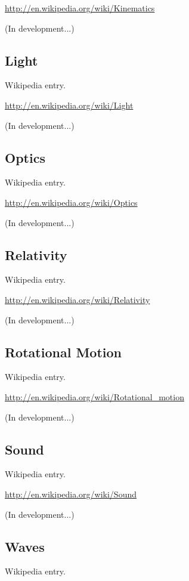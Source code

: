 \documentclass[12pt,twoside]{book}
\begin{document}
\href{http://en.wikipedia.org/wiki/Kinematics}{http://en.wikipedia.org/wiki/Kinematics}

(In development...)

\subsection[Light]{Light}
Wikipedia entry.

\href{http://en.wikipedia.org/wiki/Light}{http://en.wikipedia.org/wiki/Light}

(In development...)

\subsection[Optics]{Optics}
Wikipedia entry.

\href{http://en.wikipedia.org/wiki/Optics}{http://en.wikipedia.org/wiki/Optics}

(In development...)

\subsection[Relativity]{Relativity}
Wikipedia entry.

\href{http://en.wikipedia.org/wiki/Relativity}{http://en.wikipedia.org/wiki/Relativity}

(In development...)

\subsection[Rotational Motion]{Rotational Motion}
Wikipedia entry.

\href{http://en.wikipedia.org/wiki/Rotational_motion}{http://en.wikipedia.org/wiki/Rotational\_motion}

(In development...)

\subsection[Sound]{Sound}
Wikipedia entry.

\href{http://en.wikipedia.org/wiki/Sound}{http://en.wikipedia.org/wiki/Sound}

(In development...)

\subsection[Waves]{Waves}
Wikipedia entry.
\end{document}
